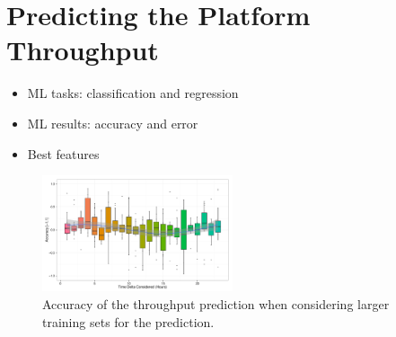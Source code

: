 \section{Predicting the Platform Throughput}\label{sec:Throughput}
\begin{itemize}

	\item ML tasks: classification and regression

	\item ML results: accuracy and error

	\item Best features

\end{itemize}







\begin{figure}[htbp]
	\centering
		\includegraphics[width=0.5\textwidth]{figures/ML_accuracy}
	\caption{Accuracy of the throughput prediction when considering larger training sets for the prediction.}
	\label{fig:accuracy}
\end{figure}

